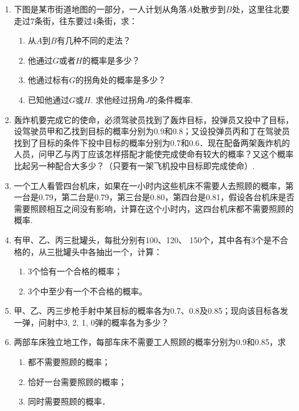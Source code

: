 \begin{enumerate}
\item 下图是某市街道地图的一部分，一人计划从角落$A$处散步到$B$处，这里往北要走过7条街，往东要过4条街，求：
\begin{enumerate}[(1)]
    \item 从$A$到$B$有几种不同的走法？
    \item 他通过$G$或者$H$的概率是多少？
    \item 他通过标有$G$的拐角处的概率是多少？
    \item 已知他通过$G$或$H$. 求他经过拐角$J$的条件概率.
\end{enumerate}

\item 轰炸机要完成它的使命，必须驾驶员找到了轰炸目标，投弹员又投中了目标，设驾驶员甲和乙找到目标的概率分别为0.9和0.8；又设投弹员丙和丁在驾驶员找到了目标的条件下投中目标的概率分别为0.7和0.6．现在配备两架轰炸机的人员，问甲乙与丙丁应该怎样搭配才能使完成使命有较大的概率？又这个概率比起另一种配合大多少？（只要有一架飞机投中目标即完成使命）.
\item 一个工人看管四台机床，如果在一小时内这些机床不需要人去照顾的概率，第一台是0.79，第二台是0.79，第三台是0.80，第四台是0.81，假设各台机床是否需要照顾相互之间没有影响，计算在这个小时内，这四台机床都不需要照顾的概率.
\item 有甲、乙、丙三批罐头，每批分别有100、120、
150个，其中各有3个是不合格的，从三批罐头中各抽出一个，计算：
\begin{enumerate}[(1)]
\item 3个恰有一个合格的概率；
\item 3个中至少有一个不合格的概率。
\end{enumerate}

\item 甲、乙、丙三步枪手射中某目标的概率各为0.7、0.8及0.85；现向该目标各发一弹，问射中3, 2, 1, 0弹的概率各为多少？
\item 两部车床独立地工作，每部车床不需要工人照顾的概率分别为0.9和0.85，求
\begin{enumerate}[(1)]
\item 都不需要照顾的概率；
\item 恰好一台需要照顾的概率；
\item 同时需要照顾的概率．
\end{enumerate}


\end{enumerate}
